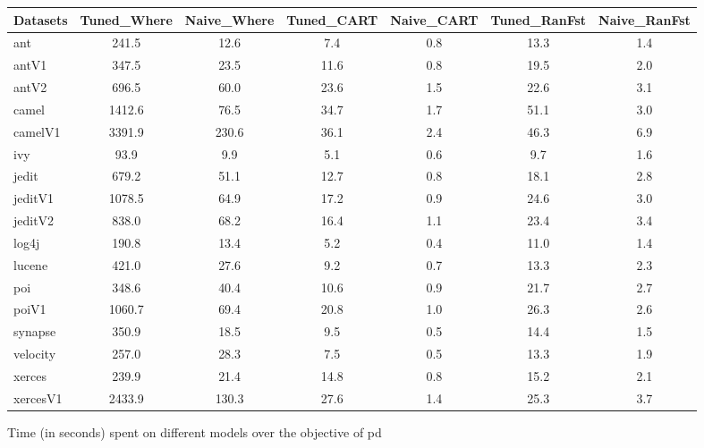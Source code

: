 \documentclass{sig-alternative}
\def\baselinestretch{1}
\begin{document}
\clearpage
\begin{figure}[!ht]

\renewcommand{\baselinestretch}{0.7}
\scriptsize
\centering
  \begin{tabular}{l|c |c |c |c |c |c }
    \hline\hline
    Datasets & Tuned\_Where & Naive\_Where & Tuned\_CART & Naive\_CART & Tuned\_RanFst & Naive\_RanFst\\
    \hline
    ant & 241.5 & 12.6 & 7.4 & 0.8 & 13.3 & 1.4\\
    antV1 & 347.5 & 23.5 & 11.6 & 0.8 & 19.5 & 2.0\\
    antV2 & 696.5 & 60.0 & 23.6 & 1.5 & 22.6 & 3.1\\
    camel & 1412.6 & 76.5 & 34.7 & 1.7 & 51.1 & 3.0\\
    camelV1 & 3391.9 & 230.6 & 36.1 & 2.4 & 46.3 & 6.9\\
    ivy & 93.9 & 9.9 & 5.1 & 0.6 & 9.7 & 1.6\\
    jedit & 679.2 & 51.1 & 12.7 & 0.8 & 18.1 & 2.8\\
    jeditV1 & 1078.5 & 64.9 & 17.2 & 0.9 & 24.6 & 3.0\\
    jeditV2 & 838.0 & 68.2 & 16.4 & 1.1 & 23.4 & 3.4\\
    log4j & 190.8 & 13.4 & 5.2 & 0.4 & 11.0 & 1.4\\
    lucene & 421.0 & 27.6 & 9.2 & 0.7 & 13.3 & 2.3\\
    poi & 348.6 & 40.4 & 10.6 & 0.9 & 21.7 & 2.7\\
    poiV1 & 1060.7 & 69.4 & 20.8 & 1.0 & 26.3 & 2.6\\
    synapse & 350.9 & 18.5 & 9.5 & 0.5 & 14.4 & 1.5\\
    velocity & 257.0 & 28.3 & 7.5 & 0.5 & 13.3 & 1.9\\
    xerces & 239.9 & 21.4 & 14.8 & 0.8 & 15.2 & 2.1\\
    xercesV1 & 2433.9 & 130.3 & 27.6 & 1.4 & 25.3 & 3.7\\
  \end{tabular}
  \caption{Time (in seconds) spent on different models over the objective of pd}
\end{figure}
\end{document}
